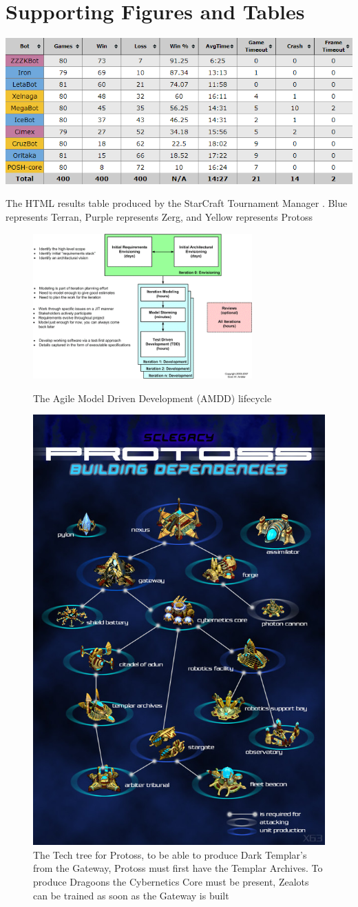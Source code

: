 \documentclass[journal]{IEEEtran}
\begin{document}
	\onecolumn
	\section{Supporting Figures and Tables}
	
	\begin{table}[H]
		\centering
		\includegraphics[width=\textwidth]{STMResultsWithBot}
		\caption{The HTML results table produced by the StarCraft Tournament Manager \cite{Tournament}. Blue represents Terran, Purple represents Zerg, and Yellow represents Protoss}
		\label{Table2}
	\end{table}
	\begin{figure}
		\centering
		\includegraphics[width=0.75\textwidth]{AMDD}
		\centering\caption{The Agile Model Driven Development (AMDD) lifecycle \cite{AMDD}}
		\label{Fig10}
		\centering
		\includegraphics[width= 0.5 \textwidth]{ProtossTechTree}
		\centering\caption{The Tech tree for Protoss, to be able to produce Dark Templar's from the Gateway, Protoss must first have the Templar Archives. To produce Dragoons the Cybernetics Core must be present, Zealots can be trained as soon as the Gateway is built \cite{Tech}}
		\label{Fig11}
	\end{figure}
\end{document}

